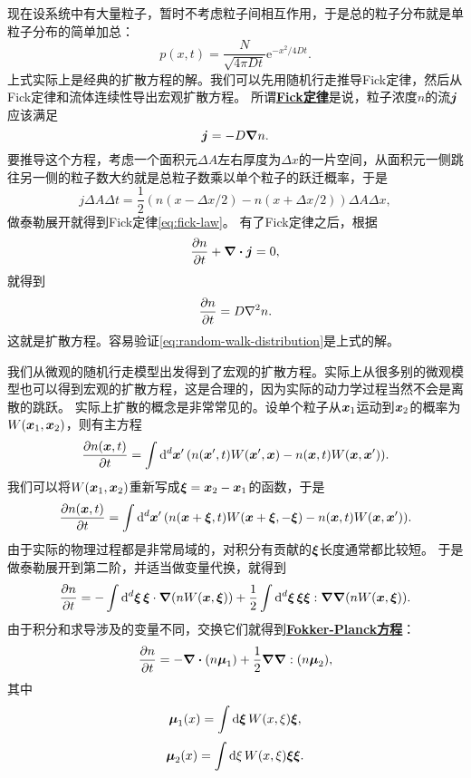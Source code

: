 \documentclass[hyperref, UTF8, a4paper]{ctexart}
\newcommand*{\ee}{\mathrm{e}}
\newcommand{\concept}[1]{\underline{\textbf{#1}}}
\begin{document}
现在设系统中有大量粒子，暂时不考虑粒子间相互作用，于是总的粒子分布就是单粒子分布的简单加总：
\begin{equation}
    p(x, t) = \frac{N}{\sqrt{4 \pi D t}} \ee^{- x^2 / 4 D t}.
    \label{eq:random-walk-distribution}
\end{equation}
上式实际上是经典的扩散方程的解。我们可以先用随机行走推导Fick定律，然后从Fick定律和流体连续性导出宏观扩散方程。
所谓\concept{Fick定律}是说，粒子浓度$n$的流$\vb*{j}$应该满足
\begin{equation}
    \vb*{j} = - D \grad{n}.
    \label{eq:fick-law}
\end{equation}
要推导这个方程，考虑一个面积元$\Delta A$左右厚度为$\Delta x$的一片空间，从面积元一侧跳往另一侧的粒子数大约就是总粒子数乘以单个粒子的跃迁概率，于是
\[
    j \Delta A \Delta t = \frac{1}{2} (n(x - \Delta x / 2) - n(x + \Delta x / 2)) \Delta A \Delta x,
\]
做泰勒展开就得到Fick定律\eqref{eq:fick-law}。
有了Fick定律之后，根据
\[
    \pdv{n}{t} + \div{\vb*{j}} = 0,
\]
就得到
\begin{equation}
    \pdv{n}{t} = D \laplacian{n}.
\end{equation}
这就是扩散方程。容易验证\eqref{eq:random-walk-distribution}是上式的解。

我们从微观的随机行走模型出发得到了宏观的扩散方程。实际上从很多别的微观模型也可以得到宏观的扩散方程，这是合理的，因为实际的动力学过程当然不会是离散的跳跃。
实际上扩散的概念是非常常见的。设单个粒子从$\vb*{x}_1$运动到$\vb*{x}_2$的概率为$W(\vb*{x}_1, \vb*{x}_2)$，则有主方程
\[
    \pdv{n(\vb*{x}, t)}{t} = \int \dd[d]{\vb*{x}'} (n(\vb*{x}', t) W(\vb*{x}', \vb*{x}) - n(\vb*{x}, t) W(\vb*{x}, \vb*{x}')).
\]
我们可以将$W(\vb*{x}_1, \vb*{x}_2)$重新写成$\vb*{\xi} = \vb*{x}_2 - \vb*{x}_1$的函数，于是
\[
    \pdv{n(\vb*{x}, t)}{t} = \int \dd[d]{\vb*{x}'} (n(\vb*{x}+\vb*{\xi}, t) W(\vb*{x}+\vb*{\xi}, -\vb*{\xi}) - n(\vb*{x}, t) W(\vb*{x}, \vb*{x}')).
\]
由于实际的物理过程都是非常局域的，对积分有贡献的$\vb*{\xi}$长度通常都比较短。
于是做泰勒展开到第二阶，并适当做变量代换，就得到
\[
    \pdv{n}{t} = - \int \dd[d]{\vb*{\xi}} \vb*{\xi} \cdot \grad{(n W(\vb*{x}, \vb*{\xi}))} + \frac{1}{2} \int \dd[d]{\vb*{\xi}} \vb*{\xi} \vb*{\xi} : \grad{\grad{(n W(\vb*{x}, \vb*{\xi}))}}.
\]
由于积分和求导涉及的变量不同，交换它们就得到\concept{Fokker-Planck方程}：
\begin{equation}
    \pdv{n}{t} = - \div{(n \vb*{\mu}_1)} + \frac{1}{2} \grad \grad : (n \vb*{\mu}_2),
\end{equation}
其中
\begin{equation}
    \vb*{\mu}_1(x) = \int \dd{\vb*{\xi}} W(x, \xi) \vb*{\xi},
\end{equation}
\begin{equation}
    \vb*{\mu}_2(x) = \int \dd{\xi} W(x, \xi) \vb*{\xi} \vb*{\xi} .
\end{equation}
\end{document}

